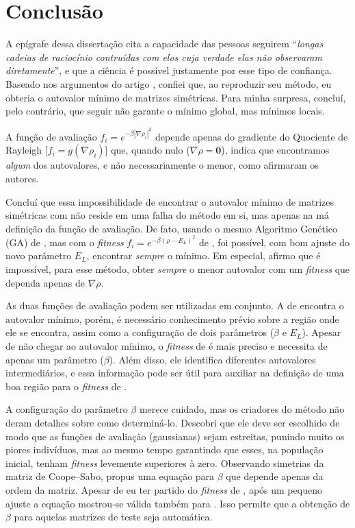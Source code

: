 \chapter{Conclusão}
\label{cap:conclusao}

	A epígrafe dessa dissertação cita a capacidade das pessoas seguirem ``\emph{longas cadeias de raciocínio contruídas com elos cuja verdade elas não observaram diretamente}'', e que a ciência é possível justamente por esse tipo de confiança. Baseado nos argumentos do artigo \cite{metodo2004}, confiei que, ao reproduzir seu método, eu obteria o autovalor mínimo de matrizes simétricas. Para minha surpresa, concluí, pelo contrário, que seguir \cite{metodo2004} não garante o mínimo global, mas mínimos locais.
	
	A função de avaliação $f_i = e^{-\beta |\nabla \rho_i|^2}$ depende apenas do gradiente do Quociente de Rayleigh [$f_i = g(\nabla \rho_i)$] que, quando nulo ($\nabla \rho = \textbf{0}$), indica que encontramos \emph{algum} dos autovalores, e não necessariamente o menor, como afirmaram os autores.
	
	Concluí que essa impossibilidade de encontrar o autovalor mínimo de matrizes simétricas com \cite{metodo2004} não reside em uma falha do método em si, mas apenas na má definição da função de avaliação. De fato, usando o mesmo Algoritmo Genético (GA) de \cite{metodo2004}, mas com o \emph{fitness} $f_i = e^{-\beta(\rho - E_L)^2}$ de \cite{metodo2011}, foi possível, com bom ajuste do novo parâmetro $E_L$, encontrar \emph{sempre} o mínimo. Em especial, afirmo que é impossível, para esse método, obter \emph{sempre} o menor autovalor com um \emph{fitness} que dependa apenas de $\nabla \rho$.

	As duas funções de avaliação podem ser utilizadas em conjunto. A de \cite{metodo2011} encontra o autovalor mínimo, porém, é necessário conhecimento prévio sobre a região onde ele se encontra, assim como a configuração de dois parâmetros ($\beta$ e $E_L$). Apesar de não chegar ao autovalor mínimo, o \emph{fitness} de \cite{metodo2004} é mais preciso e necessita de apenas um parâmetro ($\beta$). Além disso, ele identifica diferentes autovalores intermediários, e essa informação pode ser útil para auxiliar na definição de uma boa região para o \emph{fitness} de \cite{metodo2011}.
	
	A configuração do parâmetro $\beta$ merece cuidado, mas os criadores do método não deram detalhes sobre como determiná-lo. Descobri que ele deve ser escolhido de modo que as funções de avaliação (gaussianas) sejam estreitas, punindo muito os piores indivíduos, mas ao mesmo tempo garantindo que esses, na população inicial, tenham \emph{fitness} levemente superiores à zero. Observando simetrias da matriz de Coope--Sabo, propus uma equação para $\beta$ que depende apenas da ordem da matriz. Apesar de eu ter partido do \emph{fitness} de \cite{metodo2011}, após um pequeno ajuste a equação mostrou-se válida também para \cite{metodo2004}. Isso permite que a obtenção de $\beta$ para aquelas matrizes de teste seja automática.
	
